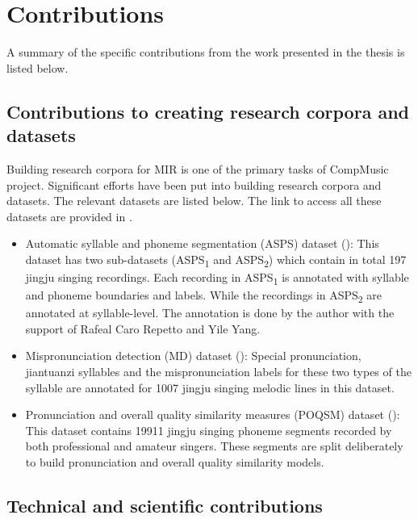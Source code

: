 \section{Contributions}

A summary of the specific contributions from the work presented in the thesis is listed below.

\subsection{Contributions to creating research corpora and datasets}

Building research corpora for \gls{MIR} is one of the primary tasks of CompMusic project. Significant efforts have been put into building research corpora and datasets. The relevant datasets are listed below. The link to access all these datasets are provided in .

\begin{itemize}[leftmargin=*]
\item Automatic syllable and phoneme segmentation (\gls{ASPS}) dataset (): This dataset has two sub-datasets (\gls{ASPS}\textsubscript{1} and \gls{ASPS}\textsubscript{2}) which contain in total 197 jingju singing recordings. Each recording in \gls{ASPS}\textsubscript{1} is annotated with syllable and phoneme boundaries and labels. While the recordings in \gls{ASPS}\textsubscript{2} are annotated at syllable-level. The annotation is done by the author with the support of Rafeal Caro Repetto and Yile Yang.
\item Mispronunciation detection (\gls{MD}) dataset (): Special pronunciation, \gls{jiantuanzi} syllables and the mispronunciation labels for these two types of the syllable are annotated for 1007 jingju singing melodic lines in this dataset.
\item Pronunciation and overall quality similarity measures (\gls{POQSM}) dataset (): This dataset contains 19911 jingju singing phoneme segments recorded by both professional and amateur singers. These segments are split deliberately to build pronunciation and overall quality similarity models.
\end{itemize}

\subsection{Technical and scientific contributions}

